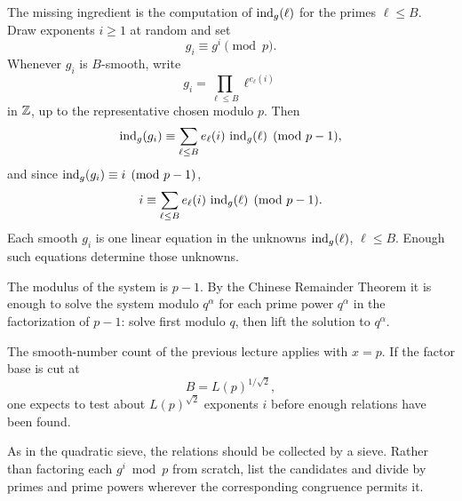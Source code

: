 

The missing ingredient is the computation of \(\operatorname{ind}_{g}(\ell)\) for the
primes \(\ell\le B\). Draw exponents \(i\ge 1\) at random and set
\[
    g_{i}\equiv g^{i}\pmod{p}.
\]
Whenever \(g_{i}\) is \(B\)-smooth, write
\[
    g_{i}=\prod_{\ell\le B}\ell^{e_{\ell}(i)}
\]
in \(\mathbb Z\), up to the representative chosen modulo \(p\). Then
\[
    \operatorname{ind}_{g}(g_{i})
    \equiv\sum_{\ell\le B}e_{\ell}(i)\,\operatorname{ind}_{g}(\ell)
    \pmod{p-1},
\]
and since \(\operatorname{ind}_{g}(g_{i})\equiv i\pmod{p-1}\),
\[
    i\equiv\sum_{\ell\le B}e_{\ell}(i)\,\operatorname{ind}_{g}(\ell)
    \pmod{p-1}.
\]
Each smooth \(g_{i}\) is one linear equation in the unknowns
\(\operatorname{ind}_{g}(\ell)\), \(\ell\le B\). Enough such equations determine those
unknowns.

The modulus of the system is \(p-1\). By the Chinese Remainder Theorem it
is enough to solve the system modulo \(q^{\alpha}\) for each prime power
\(q^{\alpha}\) in the factorization of \(p-1\): solve first modulo \(q\),
then lift the solution to \(q^{\alpha}\).

The smooth-number count of the previous lecture applies with \(x=p\).
If the factor base is cut at
\[
    B=L(p)^{1/\sqrt{2}},
\]
one expects to test about \(L(p)^{\sqrt{2}}\) exponents \(i\) before
enough relations have been found.

As in the quadratic sieve, the relations should be collected by a sieve.
Rather than factoring each \(g^{i}\bmod p\) from scratch, list the
candidates and divide by primes and prime powers wherever the
corresponding congruence permits it.


